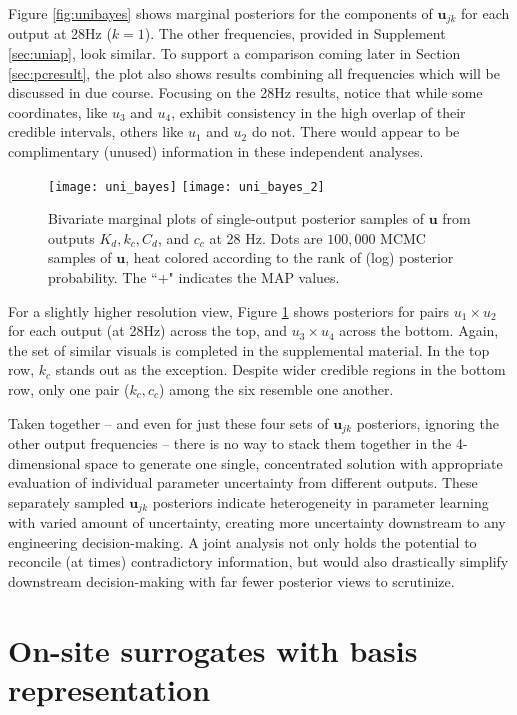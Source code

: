 \documentclass[12pt]{article}
\begin{document}
Figure \ref{fig:unibayes} shows marginal posteriors for the components of
$\mathbf{u}_{jk}$ for each output at 28Hz ($k=1$).   The other frequencies,
provided in Supplement \ref{sec:uniap}, look similar. To support a comparison
coming later in Section \ref{sec:pcresult}, the plot also shows results
combining all frequencies which will be discussed in due course.  Focusing on
the 28Hz results, notice that while some coordinates, like $u_3$ and $u_4$,
exhibit consistency in the high overlap of their credible intervals, others
like $u_1$ and $u_2$ do not.  There would appear to be complimentary (unused)
information in these independent analyses.
\begin{figure}[ht!]
\centering
\texttt{[image: uni\_bayes]}
\texttt{[image: uni\_bayes\_2]}
\caption{Bivariate marginal plots of single-output posterior samples of $\mathbf{u}$ 
 from outputs $K_d, k_c, C_d$, and $c_c$  at 28 Hz. 
Dots are $100{,}000$ MCMC samples of $\mathbf{u}$, heat 
colored according to the rank of (log)
posterior probability. The ``+" indicates the MAP values. }
\label{fig:unibayes_2}
\end{figure}
For a slightly higher resolution view, Figure \ref{fig:unibayes_2} shows
posteriors for pairs $u_1 \times u_2$ for each output (at 28Hz) across the
top, and $u_3 \times u_4$ across the bottom.  Again, the set of similar
visuals is completed in the supplemental material.  In the top row, $k_c$
stands out as the exception.  Despite wider credible regions in the bottom
row, only one pair ($k_c, c_c$) among the six resemble one another.

Taken together -- and even for just these four sets of $\mathbf{u}_{jk}$
posteriors, ignoring the other output frequencies -- there is no way to stack
them together in the 4-dimensional space to generate one single, concentrated
solution with appropriate evaluation of individual parameter uncertainty from
different outputs. These separately sampled  $\mathbf{u}_{jk}$ posteriors indicate
heterogeneity in parameter learning with varied amount of uncertainty,
creating more uncertainty downstream to any engineering decision-making. A
joint analysis not only holds the potential to reconcile (at times)
contradictory information, but would also drastically simplify downstream
decision-making with far fewer posterior views to scrutinize.

\section{On-site surrogates with basis representation}
\label{sec:muloss}
\end{document}
